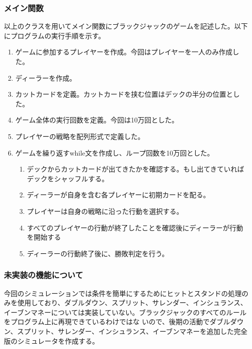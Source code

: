 \subsubsection{メイン関数}
以上のクラスを用いてメイン関数にブラックジャックのゲームを記述した。以下にプログラムの実行手順を示す。
\begin{enumerate}
    \item ゲームに参加するプレイヤーを作成。今回はプレイヤーを一人のみ作成した。
    \item ディーラーを作成。
    \item カットカードを定義。カットカードを挟む位置はデックの半分の位置とした。
    \item ゲーム全体の実行回数を定義。今回は10万回とした。
    \item プレイヤーの戦略を配列形式で定義した。
    \item ゲームを繰り返すwhile文を作成し、ループ回数を10万回とした。
    \begin{enumerate}
        \item デックからカットカードが出てきたかを確認する。もし出てきていればデックをシャッフルする。
	  \item ディーラーが自身を含む各プレイヤーに初期カードを配る。
	  \item プレイヤーは自身の戦略に沿った行動を選択する。
	  \item すべてのプレイヤーの行動が終了したことを確認後にディーラーが行動を開始する
	  \item ディーラーの行動終了後に、勝敗判定を行う。
    \end{enumerate}
\end{enumerate}

\subsubsection{未実装の機能について}
今回のシミュレーションでは条件を簡単にするためにヒットとスタンドの処理のみを使用しており、ダブルダウン、スプリット、サレンダー、インシュランス、イーブンマネーについては実装していない。ブラックジャックのすべてのルールをプログラム上に再現できているわけではな
いので、後期の活動でダブルダウン、スプリット、サレンダー、インシュランス、イーブンマネーを追加した完全版のシミュレータを作成する。
